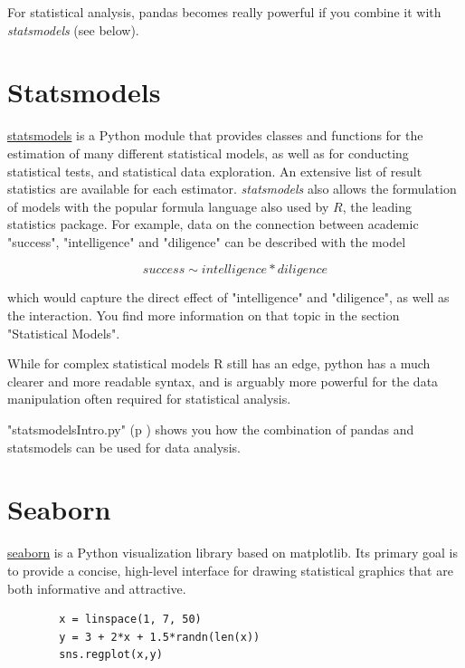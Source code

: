 For statistical analysis, pandas becomes really powerful if you combine it with \emph{statsmodels} (see below).


\section{Statsmodels}

\href{http://statsmodels.sourceforge.net/.}{statsmodels} is a Python module that provides classes and functions for the estimation of many different statistical models, as well as for conducting statistical tests, and statistical data exploration. An extensive list of result statistics are available for each estimator. \emph{statsmodels} also allows the formulation of models with the popular formula language also used by $R$, the leading statistics package. For example, data on the connection between academic "success", "intelligence" and "diligence" can be described with the model

\begin{equation*}
    success \sim intelligence * diligence
\end{equation*}

 which would capture the direct effect of "intelligence" and "diligence", as well as the interaction. You find more information on that topic in the section "Statistical Models".

While for complex statistical models R still has an edge, python has a much clearer and more readable syntax, and is arguably more powerful for the data manipulation often required for statistical analysis.

\PyImg "statsmodelsIntro.py" (p \pageref{py:statsmodelsIntro}) shows you how the combination of pandas and statsmodels can be used for data analysis.

\section{Seaborn}

\href{http://statsmodels.sourceforge.net/.}{seaborn} is a Python visualization library based on matplotlib. Its primary goal is to provide a concise, high-level interface for drawing statistical graphics that are both informative and attractive.

\begin{lstlisting}
        x = linspace(1, 7, 50)
        y = 3 + 2*x + 1.5*randn(len(x))
        sns.regplot(x,y)
\end{lstlisting}

